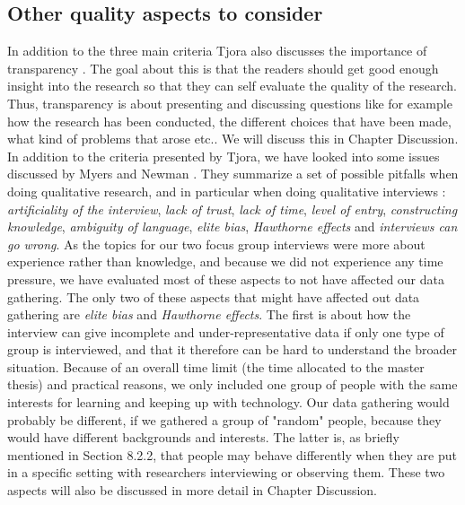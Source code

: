 \subsection{Other quality aspects to consider}
In addition to the three main criteria Tjora also discusses the importance of transparency \cite{tjora}. The goal about this is that the readers should get   good enough insight into the research so that they can self evaluate the quality of the research. Thus, transparency is about presenting and discussing questions like for example how the research has been conducted, the different choices that have been made, what kind of problems that arose etc.. We will discuss this in Chapter Discussion.  In addition to the criteria presented by Tjora, we have looked into some issues discussed by Myers and Newman \cite{interview}. They summarize a set of possible pitfalls when doing qualitative research, and in particular when doing qualitative interviews \cite{interview}: \emph{artificiality of the interview}, \emph{lack of trust}, \emph{lack of time}, \emph{level of entry}, \emph{constructing knowledge}, \emph{ambiguity of language}, \emph{elite bias}, \emph{Hawthorne effects} and \emph{interviews can go wrong}. As the topics for our two focus group interviews were more about experience rather than knowledge, and because we did not experience any time pressure, we have evaluated most of these aspects to not have affected our data gathering. The only two of these aspects that might have affected out data gathering are \emph{elite bias} and \emph{Hawthorne effects}. The first is about how the interview can give incomplete and under-representative data  if only one type of group is interviewed, and that it therefore can be hard to understand the broader situation. Because of an overall time limit (the time allocated to the master thesis) and practical reasons, we only included one group of people with the same interests for learning and keeping up with technology. Our data gathering would probably be different, if we gathered a group of "random" people, because they would have different backgrounds and interests. The latter is, as briefly mentioned in Section 8.2.2, that people may behave differently when they are put in a specific setting with researchers interviewing or observing them. These two aspects will also be discussed in more detail in Chapter Discussion.


